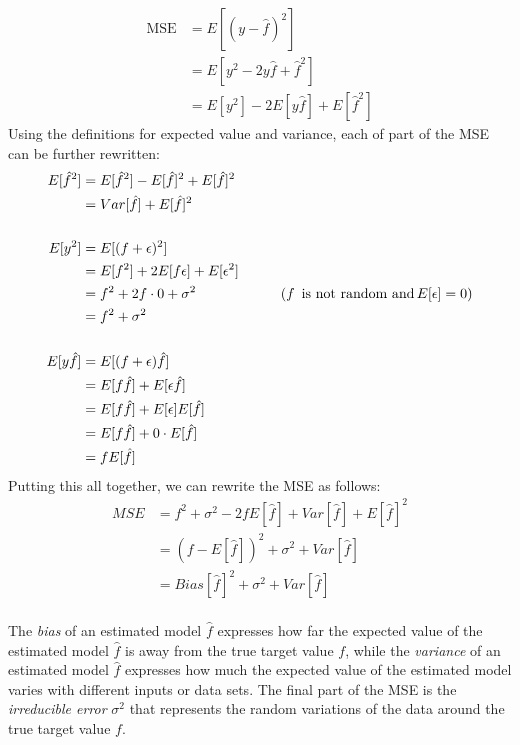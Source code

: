 \begin{advanced}
\begin{align*}
\operatorname{MSE} &= E[(y - \hat{f})^2] \\
    & = E [ y^2 - 2 y \hat{f} + \hat{f}^2] \\
    &= E [y^2] - 2E[y\hat{f}] + E[\hat{f}^2]
\end{align*}
\noindent Using the definitions for expected value and variance, each of part of the MSE can be further rewritten:
\begin{align*}
E[\hat{f}^2] &= E[\hat{f}^2] - E[\hat{f}]^2 + E[\hat{f}]^2 \\
             &= Var[\hat{f}] + E[\hat{f}]^2 \\
\\
E[y^2] &= E[(f+\epsilon)^2] \\
       &= E[f^2] + 2E[f \epsilon] + E[\epsilon^2]\\
       &= f^2 + 2f \cdot 0 + \sigma^2 &\qquad (f \text{\, is not random and} \, E[\epsilon] = 0)\\
       &= f^2 + \sigma^2 \\ 
\\
E[y \hat{f}] &= E[(f + \epsilon)\hat{f}] \\
             &= E[f \hat{f}] + E[\epsilon \hat{f}] \\
             &= E[f \hat{f}] + E[\epsilon] E[\hat{f}] \\
             &= E[f \hat{f}] + 0 \cdot E[\hat{f}] \\
             &= f E[\hat{f}] \\
\end{align*}
\noindent Putting this all together, we can rewrite the MSE as follows:
\begin{align*}
MSE &= f^2 + \sigma^2 - 2 f E[\hat{f}] + Var[\hat{f}] + E[\hat{f}]^2 \\
    &= (f - E[\hat{f}])^2 + \sigma^2 + Var[\hat{f}] \\
    &= Bias[\hat{f}]^2 + \sigma^2 + Var[\hat{f}] \\
\end{align*}
\end{advanced}

The \emph{bias} of an estimated model $\hat{f}$ expresses how far the expected value of the estimated model $\hat{f}$ is away from the true target value $f$, while the \emph{variance} of an estimated model $\hat{f}$ expresses how much the expected value of the estimated model varies with different inputs or data sets. The final part of the MSE is the \emph{irreducible error} $\sigma^2$ that represents the random variations of the data around the true target value $f$.


